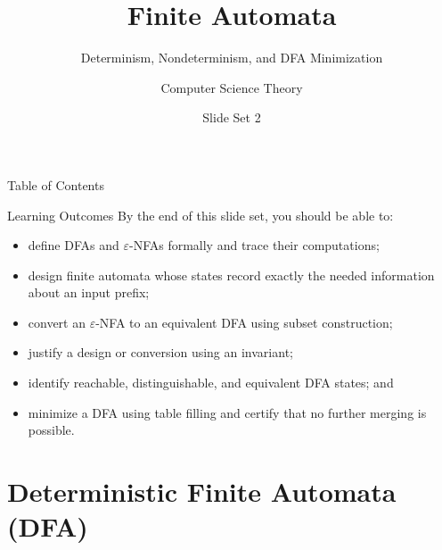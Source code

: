 \documentclass[10pt]{beamer}
\title{Finite Automata}
\subtitle{Determinism, Nondeterminism, and DFA Minimization}
\author{Computer Science Theory}
\date{Slide Set 2}
\begin{document}
\begin{frame}
  \titlepage
\end{frame}

\begin{frame}{Table of Contents}
  \tableofcontents
\end{frame}

\begin{frame}{Learning Outcomes}
  \small
  By the end of this slide set, you should be able to:
  \begin{itemize}
    \item define DFAs and $\varepsilon$-NFAs formally and trace their
      computations;
    \item design finite automata whose states record exactly the needed
      information about an input prefix;
    \item convert an $\varepsilon$-NFA to an equivalent DFA using subset
      construction;
    \item justify a design or conversion using an invariant;
    \item identify reachable, distinguishable, and equivalent DFA states; and
    \item minimize a DFA using table filling and certify that no further
      merging is possible.
  \end{itemize}
\end{frame}

\section{Deterministic Finite Automata (DFA)}
\end{document}
